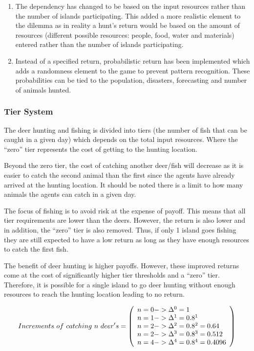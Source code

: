 \begin{enumerate}
    \item The dependency has changed to be based on the input resources rather than the number of islands participating. This added a more realistic element to the dilemma as in reality a hunt’s return would be based on the amount of resources (different possible resources: people, food, water and materials) entered rather than the number of islands participating.
    \item Instead of a specified return, probabilistic return has been implemented which adds a randomness element to the game to prevent pattern recognition. These probabilities can be tied to the population, disasters, forecasting and number of animals hunted.  
\end{enumerate}

\subsubsection{Tier System}

The deer hunting and fishing is divided into tiers (the number of fish that can be caught in a given day) which depends on the total input resources. Where the “zero” tier represents the cost of getting to the hunting location.

Beyond the zero tier, the cost of catching another deer/fish will decrease as it is easier to catch the second animal than the first since the agents have already arrived at the hunting location. It should be noted there is a limit to how many animals the agents can catch in a given day.

The focus of fishing is to avoid risk at the expense of payoff. This means that all tier requirements are lower than the deers. However, the return is also lower and in addition, the “zero” tier is also removed. Thus, if only 1 island goes fishing they are still expected to have a low return as long as they have enough resources to catch the first fish.

The benefit of deer hunting is higher payoffs. However, these improved returns come at the cost of significantly higher tier thresholds and a “zero” tier. Therefore, it is possible for a single island to go deer hunting without enough resources to reach the hunting location leading to no return.

\begin{equation}
Increments\ of\ catching\ n\ deer's=
\left( \begin{array}{ll@{}}
n=0 -> \Delta^0 = 1 \\
n=1 -> \Delta^1 = 0.8^1 \\
n=2 -> \Delta^2 = 0.8^2 = 0.64 \\
n=2 -> \Delta^3 = 0.8^3 = 0.512 \\
n=4 -> \Delta^4 = 0.8^4 = 0.4096\\
\end{array} \right) 
\label{eq:Cumulative Cost 1}
\end{equation}

